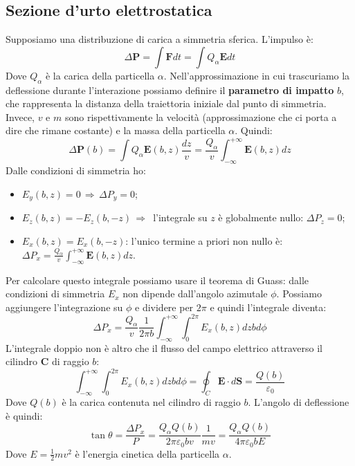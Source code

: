 \subsection{Sezione d'urto elettrostatica}
Supposiamo una distribuzione di carica a simmetria sferica. L'impulso è:
\begin{equation*}
    \Delta\mathbf{P}=\int\mathbf{F}dt=\int Q_\alpha\mathbf{E}dt
\end{equation*}
Dove $Q_\alpha$ è la carica della particella $\alpha$. Nell'approssimazione in cui trascuriamo la deflessione durante l'interazione possiamo definire il \textbf{parametro di impatto} $b$, che rappresenta la distanza della traiettoria iniziale dal punto di simmetria. Invece, $v$ e $m$ sono rispettivamente la velocità (approssimazione che ci porta a dire che rimane costante) e la massa della particella $\alpha$. Quindi:
\begin{equation*}
    \Delta\mathbf{P}(b)=\int Q_\alpha\mathbf{E}(b,z)\frac{dz}{v}=\frac{Q_\alpha}{v}\int_{-\infty}^{+\infty}\mathbf{E}(b,z)dz
\end{equation*}
Dalle condizioni di simmetria ho:
\begin{itemize}
    \item $E_y(b,z)=0 \,\Rightarrow \, \Delta P_y=0$;
    \item $E_z(b,z)=-E_z(b,-z) \, \Rightarrow \,$ l'integrale su $z$ è globalmente nullo: $\Delta P_z=0$;
    \item $E_x(b,z)=E_x(b,-z)$: l'unico termine a priori non nullo è: $\Delta P_x=\frac{Q_\alpha}{v}\int_{-\infty}^{+\infty}\mathbf{E}(b,z)dz$.
\end{itemize}
Per calcolare questo integrale possiamo usare il teorema di Guass: dalle condizioni di simmetria $E_x$ non dipende dall'angolo azimutale $\phi$. Possiamo aggiungere l'integrazione su $\phi$ e dividere per $2\pi$ e quindi l'integrale diventa:
\begin{equation*}
    \Delta P_x=\frac{Q_\alpha}{v} \frac{1}{2\pi b}\int_{-\infty}^{+\infty}\int_{0}^{2\pi}E_x(b,z)dzbd\phi
\end{equation*}
L'integrale doppio non è altro che il flusso del campo elettrico attraverso il cilindro $\mathbf{C}$ di raggio $b$:
\begin{equation*}
    \int_{-\infty}^{+\infty}\int_{0}^{2\pi}E_x(b,z)dzbd\phi=\oint_C\mathbf{E}\cdot d\mathbf{S}=\frac{Q(b)}{\varepsilon_0}
\end{equation*}
Dove $Q(b)$ è la carica contenuta nel cilindro di raggio $b$. L'angolo di deflessione è quindi:
\begin{equation*}
    \tan{\theta}=\frac{\Delta P_x}{P}=\frac{Q_\alpha Q(b)}{2\pi\varepsilon_0 bv}\frac{1}{mv}=\frac{Q_\alpha Q(b)}{4\pi\varepsilon_0 bE}
\end{equation*}
Dove $E=\frac{1}{2}mv^2$ è l'energia cinetica della particella $\alpha$.

